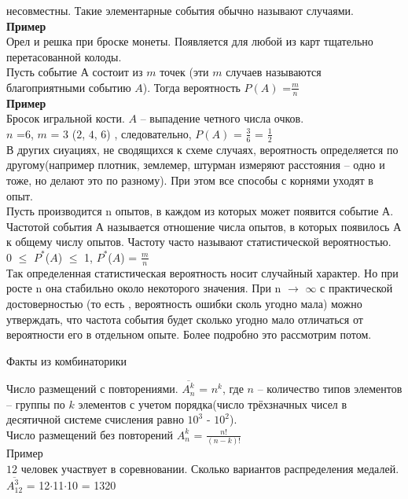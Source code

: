 \documentclass[russian, 12pt, fleqn]{article}
\begin{document}
несовместны. Такие элементарные события обычно называют случаями.\\
\textbf{Пример}\\Орел и решка при броске монеты. Появляется для любой  из карт тщательно перетасованной колоды.\\
Пусть событие $А$ состоит из $m$ точек (эти $m$ случаев называются благоприятными событию $A$). Тогда вероятность $P(A)$  =$\frac{m}{n}$\\
\textbf{Пример}\\Бросок игральной кости. $A$  -- выпадение четного числа очков.\\$n$ =$6$, $m$ = $3$ ($2$, $4$, $6$) , следовательно, $P(A)$ = $\frac{3}{6}$ = $\frac{1}{2}$ \\
В других сиуациях, не сводящихся к схеме случаях, вероятность определяется по другому(например плотник, землемер, штурман измеряют расстояния -- одно и тоже, но делают это по разному). При этом все способы 
с корнями уходят в опыт.\\
Пусть производится n опытов, в каждом из которых может появится событие $А$. Частотой события $А$ называется отношение числа опытов, в которых появилось $А$ к общему числу опытов. Частоту часто называют статистической вероятностью.\\ 
 $0$ $\leq$ $P^*$($A$) $\leq$ 1, $P^*$($A$) = $\frac{m}{n}$\\
Так определенная статистическая вероятность носит случайный характер. Но при росте n она стабильно около некоторого значения. При n  $\rightarrow$  $\infty$ с практической достоверностью (то есть , вероятность ошибки сколь угодно мала) можно утверждать, что частота события будет сколько угодно мало отличаться от вероятности его в отдельном опыте. Более подробно это рассмотрим потом.\\
\begin{center}
$\textbf{Факты из комбинаторики}$
\end{center}
Число размещений с повторениями. $\overline{A^k_n}$ = $n^k$, 
где $n$ -- количество типов элементов -- группы по $k$ элементов с учетом порядка(число трёхзначных чисел в десятичной системе счисления равно $10^3$ - $10^2$).\\
Число размещений без повторений $A^k_n$ = $\frac{n!}{(n-k)!}$\\
$\textbf{Пример}$ \\$12$ человек участвует в соревновании. Сколько вариантов распределения медалей. $\overline{A^3_{12}}$  = 12$\cdot$11$\cdot$10  = 1320\\
\end{document}
